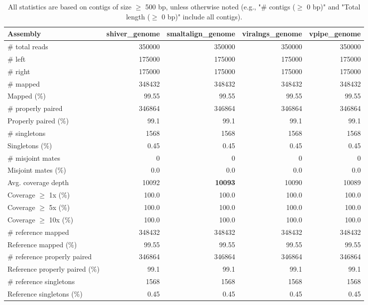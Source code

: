 \documentclass[12pt,a4paper]{article}
\begin{document}
\begin{table}[ht]
\begin{center}
\caption{All statistics are based on contigs of size $\geq$ 500 bp, unless otherwise noted (e.g., "\# contigs ($\geq$ 0 bp)" and "Total length ($\geq$ 0 bp)" include all contigs).}
\begin{tabular}{|l*{4}{|r}|}
\hline
Assembly & shiver\_genome & smaltalign\_genome & viralngs\_genome & vpipe\_genome \\ \hline
\# total reads & 350000 & 350000 & 350000 & 350000 \\ \hline
\# left & 175000 & 175000 & 175000 & 175000 \\ \hline
\# right & 175000 & 175000 & 175000 & 175000 \\ \hline
\# mapped & 348432 & 348432 & 348432 & 348432 \\ \hline
Mapped (\%) & 99.55 & 99.55 & 99.55 & 99.55 \\ \hline
\# properly paired & 346864 & 346864 & 346864 & 346864 \\ \hline
Properly paired (\%) & 99.1 & 99.1 & 99.1 & 99.1 \\ \hline
\# singletons & 1568 & 1568 & 1568 & 1568 \\ \hline
Singletons (\%) & 0.45 & 0.45 & 0.45 & 0.45 \\ \hline
\# misjoint mates & 0 & 0 & 0 & 0 \\ \hline
Misjoint mates (\%) & 0.0 & 0.0 & 0.0 & 0.0 \\ \hline
Avg. coverage depth & 10092 & {\bf 10093} & 10090 & 10089 \\ \hline
Coverage $\geq$ 1x (\%) & 100.0 & 100.0 & 100.0 & 100.0 \\ \hline
Coverage $\geq$ 5x (\%) & 100.0 & 100.0 & 100.0 & 100.0 \\ \hline
Coverage $\geq$ 10x (\%) & 100.0 & 100.0 & 100.0 & 100.0 \\ \hline
\# reference mapped & 348432 & 348432 & 348432 & 348432 \\ \hline
Reference mapped (\%) & 99.55 & 99.55 & 99.55 & 99.55 \\ \hline
\# reference properly paired & 346864 & 346864 & 346864 & 346864 \\ \hline
Reference properly paired (\%) & 99.1 & 99.1 & 99.1 & 99.1 \\ \hline
\# reference singletons & 1568 & 1568 & 1568 & 1568 \\ \hline
Reference singletons (\%) & 0.45 & 0.45 & 0.45 & 0.45 \\ \hline

\end{tabular}
\end{center}
\end{table}
\end{document}
